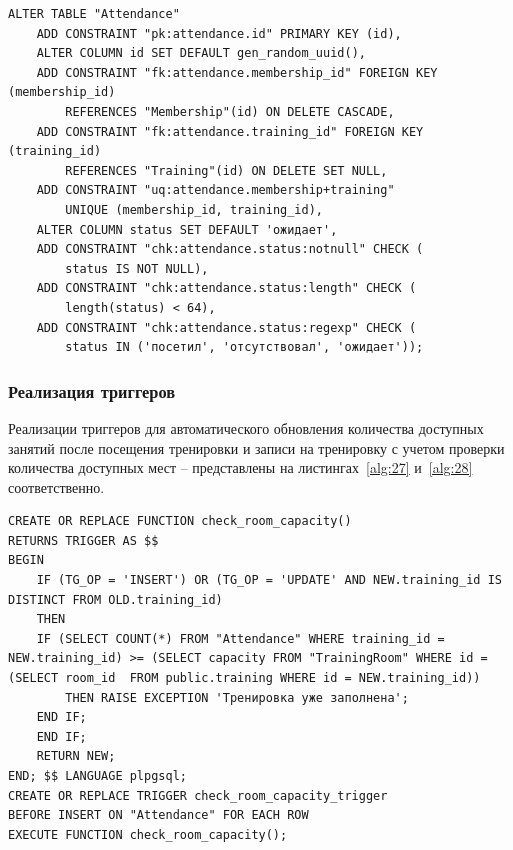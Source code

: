 \begin{lstlisting}[label=alg:26, caption=Реализация  ограничений целостности данных отношения Attendance, captionpos=t]
ALTER TABLE "Attendance"
	ADD CONSTRAINT "pk:attendance.id" PRIMARY KEY (id),
	ALTER COLUMN id SET DEFAULT gen_random_uuid(),
	ADD CONSTRAINT "fk:attendance.membership_id" FOREIGN KEY (membership_id) 
		REFERENCES "Membership"(id) ON DELETE CASCADE,
	ADD CONSTRAINT "fk:attendance.training_id" FOREIGN KEY (training_id) 
		REFERENCES "Training"(id) ON DELETE SET NULL,
	ADD CONSTRAINT "uq:attendance.membership+training" 
		UNIQUE (membership_id, training_id),
	ALTER COLUMN status SET DEFAULT 'ожидает',
	ADD CONSTRAINT "chk:attendance.status:notnull" CHECK (
		status IS NOT NULL),
	ADD CONSTRAINT "chk:attendance.status:length" CHECK (
		length(status) < 64),
	ADD CONSTRAINT "chk:attendance.status:regexp" CHECK (
		status IN ('посетил', 'отсутствовал', 'ожидает'));
\end{lstlisting}

\subsubsection{Реализация триггеров}

Реализации триггеров для автоматического обновления количества доступных занятий после посещения тренировки и записи на тренировку с учетом проверки количества доступных мест -- представлены на листингах~\ref{alg:27} и~\ref{alg:28} соответственно.

\begin{lstlisting}[label=alg:28, caption=Реализация триггера для записи на тренировку с учетом проверки количества доступных мест, captionpos=t]
CREATE OR REPLACE FUNCTION check_room_capacity()
RETURNS TRIGGER AS $$
BEGIN
	IF (TG_OP = 'INSERT') OR (TG_OP = 'UPDATE' AND NEW.training_id IS DISTINCT FROM OLD.training_id) 
	THEN
	IF (SELECT COUNT(*) FROM "Attendance" WHERE training_id = NEW.training_id) >= (SELECT capacity FROM "TrainingRoom" WHERE id = (SELECT room_id  FROM public.training WHERE id = NEW.training_id))
		THEN RAISE EXCEPTION 'Тренировка уже заполнена';
	END IF;
	END IF;
	RETURN NEW;
END; $$ LANGUAGE plpgsql;
CREATE OR REPLACE TRIGGER check_room_capacity_trigger
BEFORE INSERT ON "Attendance" FOR EACH ROW
EXECUTE FUNCTION check_room_capacity();
\end{lstlisting}

